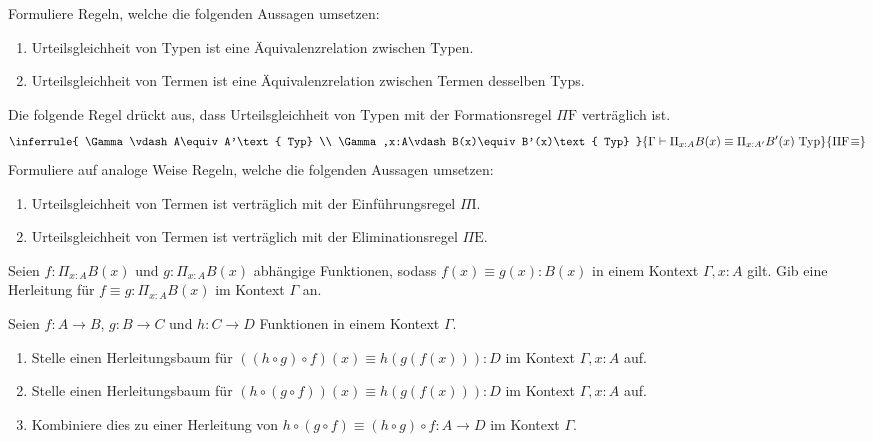 \documentclass{uebung}
\begin{document}

\begin{exercise}
  Formuliere Regeln, welche die folgenden Aussagen umsetzen:
  \begin{enumerate}
    \item Urteilsgleichheit von Typen ist eine Äquivalenzrelation zwischen Typen.
    \item Urteilsgleichheit von Termen ist eine Äquivalenzrelation zwischen Termen desselben Typs.
  \end{enumerate}
  Die folgende Regel drückt aus, dass Urteilsgleichheit von Typen mit der Formationsregel $\Pi\mathrm{F}$ verträglich ist.
  $$
  \inferrule{
    \Gamma\vdash A\equiv A'\text{ Typ} \\ \Gamma,x:A\vdash B(x)\equiv B'(x)\text{ Typ}
  }{
    \Gamma\vdash \Pi_{x:A}B(x)\equiv\Pi_{x:A'}B'(x)\text{ Typ}
  }{
    \Pi\mathrm{F}\!\equiv
  }
  $$
  Formuliere auf analoge Weise Regeln, welche die folgenden Aussagen umsetzen:
  \begin{enumerate}[start=3]
    \item Urteilsgleichheit von Termen ist verträglich mit der Einführungsregel $\Pi\mathrm{I}$.
    \item Urteilsgleichheit von Termen ist verträglich mit der Eliminationsregel $\Pi\mathrm{E}$.
  \end{enumerate}
\end{exercise}

\begin{exercise}
  Seien $f:\Pi_{x:A}B(x)$ und $g:\Pi_{x:A}B(x)$ abhängige Funktionen, sodass $f(x)\equiv g(x):B(x)$ in einem Kontext $\Gamma,x:A$ gilt.
  Gib eine Herleitung für $f\equiv g:\Pi_{x:A}B(x)$ im Kontext $\Gamma$ an.
\end{exercise}

\begin{exercise}
  Seien $f:A\to B$, $g:B\to C$ und $h:C\to D$ Funktionen in einem Kontext $\Gamma$.
  \begin{enumerate}
    \item Stelle einen Herleitungsbaum für $((h\circ g)\circ f)(x)\equiv h(g(f(x))):D$ im Kontext $\Gamma,x:A$ auf.
    \item Stelle einen Herleitungsbaum für $(h\circ (g\circ f))(x)\equiv h(g(f(x))):D$ im Kontext $\Gamma,x:A$ auf.
    \item Kombiniere dies zu einer Herleitung von $h\circ(g\circ f)\equiv (h\circ g)\circ f:A\to D$ im Kontext $\Gamma$.
  \end{enumerate}
\end{exercise}
\end{document}
